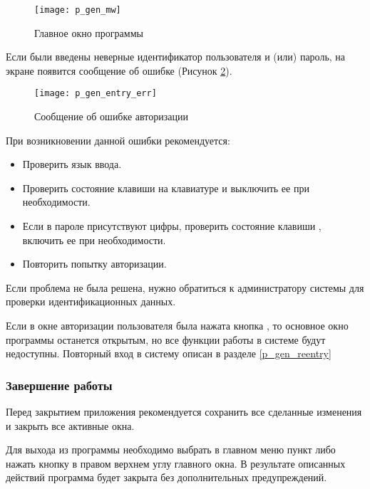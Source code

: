 \begin{figure}[ht]\centering
 \texttt{[image: p\_gen\_mw]}
 \caption{Главное окно программы}
 \label{img_gen_mw}
\end{figure} 

Если были введены неверные идентификатор пользователя и (или) пароль, на экране появится сообщение об ошибке (Рисунок \ref{img_gen_entry_err}).

\begin{figure}[ht]\centering
 \texttt{[image: p\_gen\_entry\_err]}
 \caption{Сообщение об ошибке авторизации}
 \label{img_gen_entry_err}
\end{figure} 

При возникновении данной ошибки рекомендуется:
\begin{itemize}
 \item Проверить язык ввода.
 \item Проверить состояние клавиши  на клавиатуре и выключить ее при необходимости. 
 \item Если в пароле присутствуют цифры, проверить состояние клавиши , включить ее при необходимости.
 \item Повторить попытку авторизации.
\end{itemize}
 
Если проблема не была решена, нужно обратиться к администратору системы для проверки идентификационных данных.

Если в окне авторизации пользователя была нажата кнопка  , то основное окно программы останется открытым, но все функции работы в системе будут недоступны. Повторный вход в систему описан в разделе \ref{p_gen_reentry}

\subsubsection{Завершение работы}

\begin{vnim}
Перед закрытием приложения рекомендуется  сохранить все сделанные изменения и закрыть все активные окна.
\end{vnim}

Для выхода из программы необходимо выбрать в главном меню пункт  либо нажать кнопку    в правом верхнем углу главного окна. В результате описанных действий программа будет закрыта без дополнительных предупреждений.

